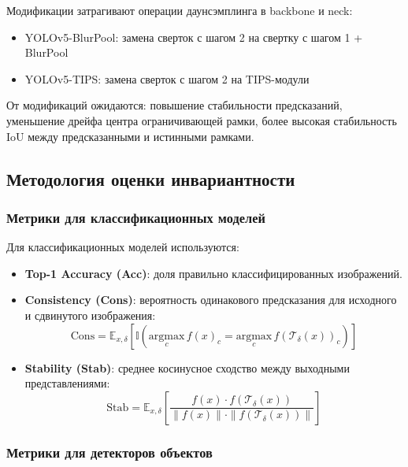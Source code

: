 Модификации затрагивают операции даунсэмплинга в backbone и neck:
\begin{itemize}
    \item YOLOv5-BlurPool: замена сверток с шагом 2 на свертку с шагом 1 + BlurPool
    \item YOLOv5-TIPS: замена сверток с шагом 2 на TIPS-модули
\end{itemize}

От модификаций ожидаются: повышение стабильности предсказаний, уменьшение дрейфа центра ограничивающей рамки, более высокая стабильность IoU между предсказанными и истинными рамками.

\subsection{Методология оценки инвариантности}
\label{sec:evaluation}

\subsubsection{Метрики для классификационных моделей}
\label{sec:evaluation:classification}

Для классификационных моделей используются:

\begin{itemize}
    \item \textbf{Top-1 Accuracy (Acc)}: доля правильно классифицированных изображений.
    
    \item \textbf{Consistency (Cons)}: вероятность одинакового предсказания для исходного и сдвинутого изображения:
    \begin{equation}
    \text{Cons} = \mathbb{E}_{x, \delta} \left[ \mathbb{I} \left( \underset{c}{\text{argmax}} \, f(x)_c = \underset{c}{\text{argmax}} \, f(\mathcal{T}_\delta(x))_c \right) \right]
    \end{equation}
    
    \item \textbf{Stability (Stab)}: среднее косинусное сходство между выходными представлениями:
    \begin{equation}
    \text{Stab} = \mathbb{E}_{x, \delta} \left[ \frac{f(x) \cdot f(\mathcal{T}_\delta(x))}{\|f(x)\| \cdot \|f(\mathcal{T}_\delta(x))\|} \right]
    \end{equation}
\end{itemize}

\subsubsection{Метрики для детекторов объектов}
\label{sec:evaluation:detection}

